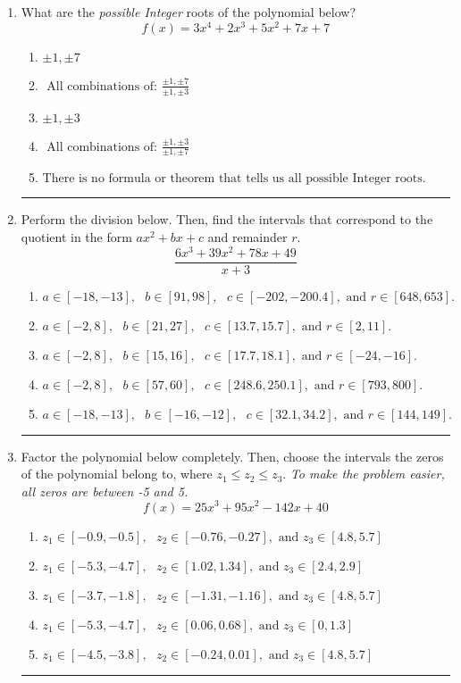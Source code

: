 \documentclass[14pt]{extbook}
\newcommand{\litem}[1]{\item#1\hspace*{-1cm}\rule{\textwidth}{0.4pt}}
\begin{document}
\begin{enumerate}
{\begin{enumerate}[label=\Alph*.]
\end{enumerate} }
\litem{
What are the \textit{possible Integer} roots of the polynomial below?\[ f(x) = 3x^{4} +2 x^{3} +5 x^{2} +7 x + 7 \]\begin{enumerate}[label=\Alph*.]
\item \( \pm 1,\pm 7 \)
\item \( \text{ All combinations of: }\frac{\pm 1,\pm 7}{\pm 1,\pm 3} \)
\item \( \pm 1,\pm 3 \)
\item \( \text{ All combinations of: }\frac{\pm 1,\pm 3}{\pm 1,\pm 7} \)
\item \( \text{There is no formula or theorem that tells us all possible Integer roots.} \)

\end{enumerate} }
\litem{
Perform the division below. Then, find the intervals that correspond to the quotient in the form $ax^2+bx+c$ and remainder $r$.\[ \frac{6x^{3} +39 x^{2} +78 x + 49}{x + 3} \]\begin{enumerate}[label=\Alph*.]
\item \( a \in [-18, -13], \text{   } b \in [91, 98], \text{   } c \in [-202, -200.4], \text{   and   } r \in [648, 653]. \)
\item \( a \in [-2, 8], \text{   } b \in [21, 27], \text{   } c \in [13.7, 15.7], \text{   and   } r \in [2, 11]. \)
\item \( a \in [-2, 8], \text{   } b \in [15, 16], \text{   } c \in [17.7, 18.1], \text{   and   } r \in [-24, -16]. \)
\item \( a \in [-2, 8], \text{   } b \in [57, 60], \text{   } c \in [248.6, 250.1], \text{   and   } r \in [793, 800]. \)
\item \( a \in [-18, -13], \text{   } b \in [-16, -12], \text{   } c \in [32.1, 34.2], \text{   and   } r \in [144, 149]. \)

\end{enumerate} }
\litem{
Factor the polynomial below completely. Then, choose the intervals the zeros of the polynomial belong to, where $z_1 \leq z_2 \leq z_3$. \textit{To make the problem easier, all zeros are between -5 and 5.}\[ f(x) = 25x^{3} +95 x^{2} -142 x + 40 \]\begin{enumerate}[label=\Alph*.]
\item \( z_1 \in [-0.9, -0.5], \text{   }  z_2 \in [-0.76, -0.27], \text{   and   } z_3 \in [4.8, 5.7] \)
\item \( z_1 \in [-5.3, -4.7], \text{   }  z_2 \in [1.02, 1.34], \text{   and   } z_3 \in [2.4, 2.9] \)
\item \( z_1 \in [-3.7, -1.8], \text{   }  z_2 \in [-1.31, -1.16], \text{   and   } z_3 \in [4.8, 5.7] \)
\item \( z_1 \in [-5.3, -4.7], \text{   }  z_2 \in [0.06, 0.68], \text{   and   } z_3 \in [0, 1.3] \)
\item \( z_1 \in [-4.5, -3.8], \text{   }  z_2 \in [-0.24, 0.01], \text{   and   } z_3 \in [4.8, 5.7] \)


\end{enumerate}}
\end{enumerate}
\end{document}
